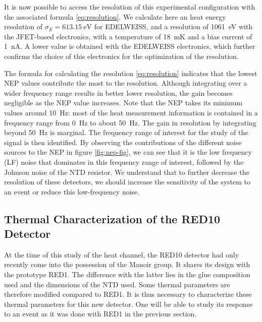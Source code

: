 It is now possible to access the resolution of this experimental configuration with the associated formula \ref{eq:resolution}. We calculate here an heat energy resolution of $\sigma_E = \SI{613.15}{\eV}$ for EDELWEISS, and a resolution of \SI{1061}{\eV} with the JFET-based electronics, with a temperature of \SI{18}{\milli\kelvin} and a bias current of \SI{1}{\nano\ampere}. A lower value is obtained with the EDELWEISS electronics, which further confirms the choice of this electronics for the optimization of the resolution.

The formula for calculating the resolution \ref{eq:resolution} indicates that the lowest NEP values contribute the most to the resolution. Although integrating over a wider frequency range results in better lower resolution, the gain becomes negligible as the NEP value increases.
Note that the NEP takes its minimum values around \SI{10}{\Hz}: most of the heat measurement information is contained in a frequency range from \SI{0}{\Hz} to about \SI{50}{Hz}. The gain in resolution by integrating beyond \SI{50}{\Hz} is marginal. The frequency range of interest for the study of the signal is then identified. By observing the contributions of the different noise sources to the NEP in figure \ref{fig:nep-fig}, we can see that it is the low frequency (LF) noise that dominates in this frequency range of interest, followed by the Johnson noise of the NTD resistor. We understand that to further decrease the resolution of these detectors, we should increase the sensitivity of the system to an event or reduce this low-frequency noise. %



\subsection{Thermal Characterization of the RED10 Detector}

At the time of this study of the heat channel, the RED10 detector had only recently come into the possession of the Manoir group. It shares its design with the prototype RED1. The difference with the latter lies in the glue composition used and the dimensions of the NTD used. Some thermal parameters are therefore modified compared to RED1. It is thus necessary to characterize these thermal parameters for this new detector. One will be able to study its response to an event as it was done with RED1 in the previous section.

